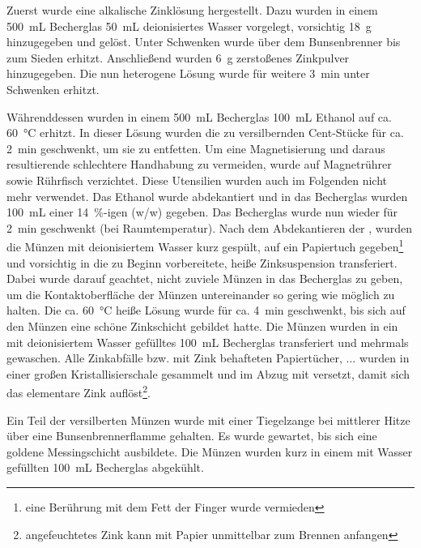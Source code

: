 \documentclass{article}
\begin{document}
        Zuerst wurde eine alkalische Zinklösung hergestellt. Dazu wurden in einem \SI[mode=text]{500}{\milli\liter} Becherglas \SI[mode=text]{50}{\milli\liter} deionisiertes Wasser vorgelegt, vorsichtig \SI[mode=text]{18}{\gram}  hinzugegeben und gelöst. Unter Schwenken wurde über dem Bunsenbrenner bis zum Sieden erhitzt. Anschließend wurden \SI[mode=text]{6}{\gram} zerstoßenes Zinkpulver hinzugegeben. Die nun heterogene Lösung wurde für weitere \SI[mode=text]{3}{\minute} unter Schwenken erhitzt. 
        
        Währenddessen wurden in einem \SI[mode=text]{500}{\milli\liter} Becherglas \SI[mode=text]{100}{\milli\liter} Ethanol auf ca. \SI[mode=text]{60}{\degreeCelsius} erhitzt. In dieser Lösung wurden die zu versilbernden Cent-Stücke für ca. \SI[mode=text]{2}{\minute} geschwenkt, um sie zu entfetten. Um eine Magnetisierung und daraus resultierende schlechtere Handhabung zu vermeiden, wurde auf Magnetrührer sowie Rührfisch verzichtet. Diese Utensilien wurden auch im Folgenden nicht mehr verwendet. Das Ethanol wurde abdekantiert und in das Becherglas wurden \SI[mode=text]{100}{\milli\liter} einer \SI[mode=text]{14}{\percent}-igen (w/w)  gegeben. Das Becherglas wurde nun wieder für \SI[mode=text]{2}{\minute} geschwenkt (bei Raumtemperatur). Nach dem Abdekantieren der , wurden die Münzen mit deionisiertem Wasser kurz gespült, auf ein Papiertuch gegeben\footnote{eine Berührung mit dem Fett der Finger wurde vermieden} und vorsichtig in die zu Beginn vorbereitete, heiße Zinksuspension transferiert. Dabei wurde darauf geachtet, nicht zuviele Münzen in das Becherglas zu geben, um die Kontaktoberfläche der Münzen untereinander so gering wie möglich zu halten. Die ca. \SI[mode=text]{60}{\degreeCelsius} heiße Lösung wurde für ca. \SI[mode=text]{4}{\minute} geschwenkt, bis sich auf den Münzen eine schöne Zinkschicht gebildet hatte. Die Münzen wurden in ein mit deionisiertem Wasser gefülltes \SI[mode=text]{100}{\milli\liter} Becherglas transferiert und mehrmals gewaschen. Alle Zinkabfälle bzw. mit Zink behafteten Papiertücher, ... wurden in einer großen Kristallisierschale gesammelt und im Abzug mit  versetzt, damit sich das elementare Zink auflöst\footnote{angefeuchtetes Zink kann mit Papier unmittelbar zum Brennen anfangen}.
        
        Ein Teil der versilberten Münzen wurde mit einer Tiegelzange bei mittlerer Hitze über eine Bunsenbrennerflamme gehalten. Es wurde gewartet, bis sich eine goldene Messingschicht ausbildete. Die Münzen wurden kurz in einem mit Wasser gefüllten \SI[mode=text]{100}{\milli\liter} Becherglas abgekühlt.
      
\end{document}
